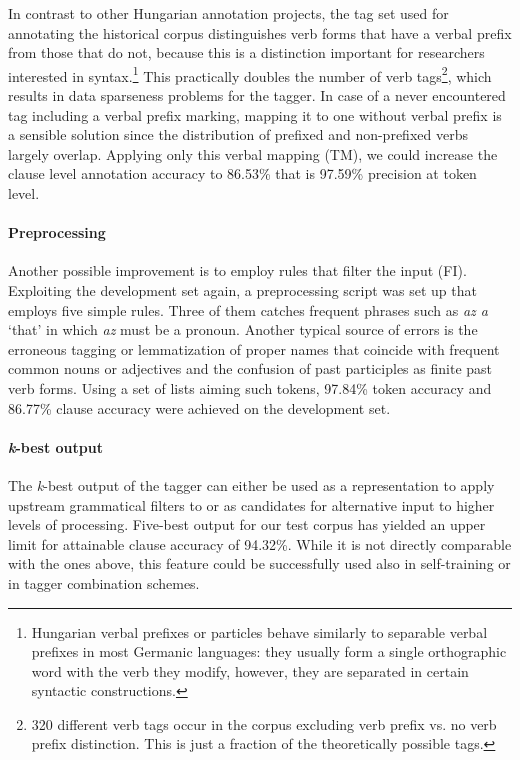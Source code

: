 In contrast to other Hungarian annotation projects, the tag set used for annotating the historical corpus distinguishes verb forms that have a verbal prefix from those that do not, because this is a distinction important for researchers interested in syntax.\footnote{ Hungarian verbal prefixes or particles behave similarly to separable verbal prefixes in most Germanic languages: they usually form a single orthographic word with the verb they modify, however, they are separated in certain syntactic constructions.} This practically doubles the number of verb tags\footnote{ 320 different verb tags occur in the corpus excluding verb prefix vs. no verb prefix distinction.
This is just a fraction of the theoretically possible tags.}, which results in data sparseness problems for the tagger.
In case of a never encountered tag including a verbal prefix marking, mapping it to one without verbal prefix is a sensible solution since the distribution of prefixed and non-prefixed verbs largely overlap.
Applying only this verbal mapping (TM), we could increase the clause level annotation accuracy to 86.53\% that is 97.59\% precision at token level.

\paragraph{Preprocessing}

Another possible improvement is to employ rules that filter the input (FI).
Exploiting the development set again, a preprocessing script was set up that employs five simple rules.
Three of them catches frequent phrases such as \emph{az a} ‘that’ in which \emph{az} must be a pronoun.
Another typical source of errors is the erroneous tagging or lemmatization of proper names that coincide with frequent common nouns or adjectives and the confusion of past participles as finite past verb forms.
Using a set of lists aiming such tokens, 97.84\% token accuracy and 86.77\% clause accuracy were achieved on the development set.

\paragraph{\emph{\emph{k}}-best output}

The \emph{\emph{k}}-best output of the tagger can either be used as a representation to apply upstream grammatical filters to or as candidates for alternative input to higher levels of processing.
Five-best output for our test corpus has yielded an upper limit for attainable clause accuracy of 94.32\%.
While it is not directly comparable with the ones above, this feature could be successfully used also in self-training or in tagger combination schemes.


